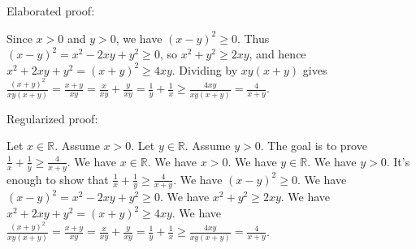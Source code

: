\documentclass{article}
\begin{document}
Elaborated proof:
\begin{tcolorbox}[colback=green!10, width=\linewidth]
Since $x>0$ and $y>0$, we have $(x-y)^2 \ge 0$. Thus $(x-y)^2 = x^2 -2xy + y^2 \ge 0$, so $x^2 + y^2 \ge 2xy$, and hence $x^2 + 2xy + y^2 = (x+y)^2 \ge 4xy$. Dividing by $xy(x+y)$ gives $\frac{(x+y)^2}{xy(x+y)} = \frac{x+y}{xy} = \frac{x}{xy} + \frac{y}{xy} = \frac{1}{y}+\frac{1}{x} \ge \frac{4xy}{xy(x+y)} = \frac{4}{x+y}$.
\end{tcolorbox}

Regularized proof:
\begin{tcolorbox}[colback=red!10, width=\linewidth]
Let $x\in\mathbb{R}$.
Assume $x>0$.
Let $y\in\mathbb{R}$.
Assume $y>0$.
The goal is to prove $\frac{1}{x} + \frac{1}{y} \ge \frac{4}{x+y}$.
We have $x \in \mathbb{R}$.
We have $x>0$.
We have $y \in \mathbb{R}$.
We have $y>0$.
It's enough to show that $\frac{1}{x} + \frac{1}{y} \ge \frac{4}{x+y}$.
We have ${(x-y)}^2 \ge 0$.
We have ${(x-y)}^2 = x^2 -2xy + y^2 \ge 0$.
We have $x^2 + y^2 \ge 2xy$.
We have $x^2 + 2xy + y^2 = {(x+y)}^2 \ge 4xy$.
We have $\frac{{(x+y)}^2}{xy(x+y)} = \frac{x+y}{xy} = \frac{x}{xy} + \frac{y}{xy} = \frac{1}{y}+\frac{1}{x} \ge \frac{4xy}{xy(x+y)} = \frac{4}{x+y}$.
\end{tcolorbox}
\end{document}
